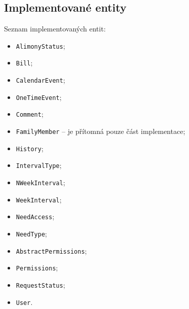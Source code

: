     \subsection{Implementované entity}\label{analyza:implementace:tridy}
        Seznam implementovaných entit:
        \begin{itemize}
            \item \texttt{AlimonyStatus};
            \item \texttt{Bill};
            \item \texttt{CalendarEvent};
            \item \texttt{OneTimeEvent};
            \item \texttt{Comment};
            \item \texttt{FamilyMember} -- je přítomná pouze část implementace;
            \item \texttt{History};
            \item \texttt{IntervalType};
            \item \texttt{NWeekInterval};
            \item \texttt{WeekInterval};
            \item \texttt{NeedAccess};
            \item \texttt{NeedType};
            \item \texttt{AbstractPermissions};
            \item \texttt{Permissions};
            \item \texttt{RequestStatus};
            \item \texttt{User}.
        \end{itemize}
        
